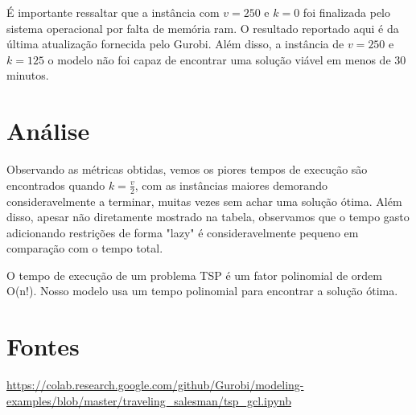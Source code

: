 \documentclass[11pt]{article}
\theoremstyle{definition}
\theoremstyle{definition}
\theoremstyle{remark}
\theoremstyle{remark}
\theoremstyle{remark}
\theoremstyle{remark}
\theoremstyle{definition}
\begin{document}
É importante ressaltar que a instância com \(v=250\) e \(k=0\) foi finalizada pelo sistema operacional por falta de memória ram. O resultado reportado aqui é da última atualização fornecida pelo Gurobi. Além disso, a instância de $v=250$ e $k=125$ o modelo não foi capaz de encontrar uma solução viável em menos de $30$ minutos.

\section*{Análise}
\label{sec:org7143c1c}
Observando as métricas obtidas, vemos os piores tempos de execução são encontrados quando \(k = \frac{v}{2}\), com as instâncias maiores demorando consideravelmente a terminar, muitas vezes sem achar uma solução ótima. Além disso, apesar não diretamente mostrado na tabela, observamos que o tempo gasto adicionando restrições de forma "lazy" é consideravelmente pequeno em comparação com o tempo total.

O tempo de execução de um problema TSP é um fator polinomial de ordem O(n!). Nosso modelo usa um tempo polinomial para encontrar a solução ótima.
\section*{Fontes}
\label{sec:org013517e}
\url{https://colab.research.google.com/github/Gurobi/modeling-examples/blob/master/traveling\_salesman/tsp\_gcl.ipynb}
\end{document}

